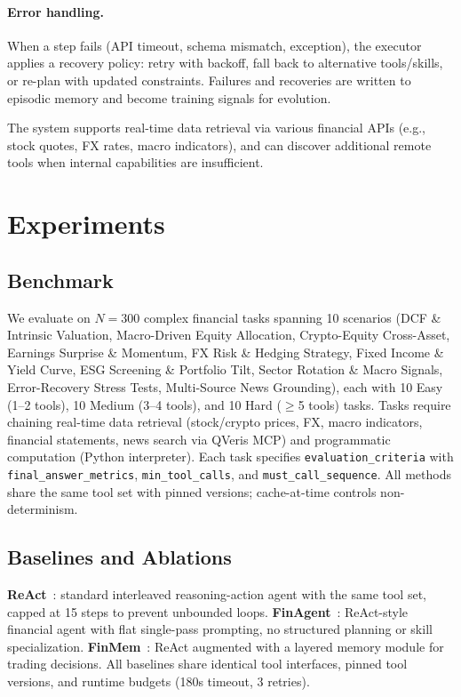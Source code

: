 \documentclass{article}
\begin{document}
\paragraph{Error handling.}
When a step fails (API timeout, schema mismatch, exception), the executor applies a recovery policy: retry with backoff, fall back to alternative tools/skills, or re-plan with updated constraints. Failures and recoveries are written to episodic memory and become training signals for evolution.

The system supports real-time data retrieval via various financial APIs (e.g., stock quotes, FX rates, macro indicators), and can discover additional remote tools when internal capabilities are insufficient.

\section{Experiments}
\subsection{Benchmark}
We evaluate on $N=300$ complex financial tasks spanning 10 scenarios (DCF \& Intrinsic Valuation, Macro-Driven Equity Allocation, Crypto-Equity Cross-Asset, Earnings Surprise \& Momentum, FX Risk \& Hedging Strategy, Fixed Income \& Yield Curve, ESG Screening \& Portfolio Tilt, Sector Rotation \& Macro Signals, Error-Recovery Stress Tests, Multi-Source News Grounding), each with 10 Easy (1--2 tools), 10 Medium (3--4 tools), and 10 Hard ($\ge$5 tools) tasks. Tasks require chaining real-time data retrieval (stock/crypto prices, FX, macro indicators, financial statements, news search via QVeris MCP) and programmatic computation (Python interpreter). Each task specifies \texttt{evaluation\_criteria} with \texttt{final\_answer\_metrics}, \texttt{min\_tool\_calls}, and \texttt{must\_call\_sequence}. All methods share the same tool set with pinned versions; cache-at-time controls non-determinism.

\subsection{Baselines and Ablations}
\textbf{ReAct}~\citep{yao2023react}: standard interleaved reasoning-action agent with the same tool set, capped at 15 steps to prevent unbounded loops. \textbf{FinAgent}~\citep{tradingagents2024}: ReAct-style financial agent with flat single-pass prompting, no structured planning or skill specialization. \textbf{FinMem}~\citep{finmem2023}: ReAct augmented with a layered memory module for trading decisions. All baselines share identical tool interfaces, pinned tool versions, and runtime budgets (180s timeout, 3 retries).
\end{document}
